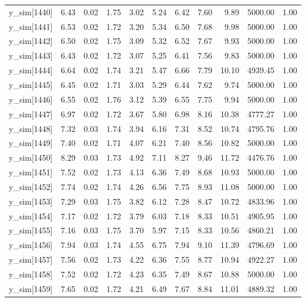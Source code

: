 \begin{table}[ht]
\begin{tabular}{rrrrrrrrrrr}
  y\_sim[1440] & 6.43 & 0.02 & 1.75 & 3.02 & 5.24 & 6.42 & 7.60 & 9.89 & 5000.00 & 1.00 \\ 
  y\_sim[1441] & 6.53 & 0.02 & 1.72 & 3.20 & 5.34 & 6.50 & 7.68 & 9.98 & 5000.00 & 1.00 \\ 
  y\_sim[1442] & 6.50 & 0.02 & 1.75 & 3.09 & 5.32 & 6.52 & 7.67 & 9.93 & 5000.00 & 1.00 \\ 
  y\_sim[1443] & 6.43 & 0.02 & 1.72 & 3.07 & 5.25 & 6.41 & 7.56 & 9.83 & 5000.00 & 1.00 \\ 
  y\_sim[1444] & 6.64 & 0.02 & 1.74 & 3.21 & 5.47 & 6.66 & 7.79 & 10.10 & 4939.45 & 1.00 \\ 
  y\_sim[1445] & 6.45 & 0.02 & 1.71 & 3.03 & 5.29 & 6.44 & 7.62 & 9.74 & 5000.00 & 1.00 \\ 
  y\_sim[1446] & 6.55 & 0.02 & 1.76 & 3.12 & 5.39 & 6.55 & 7.75 & 9.94 & 5000.00 & 1.00 \\ 
  y\_sim[1447] & 6.97 & 0.02 & 1.72 & 3.67 & 5.80 & 6.98 & 8.16 & 10.38 & 4777.27 & 1.00 \\ 
  y\_sim[1448] & 7.32 & 0.03 & 1.74 & 3.94 & 6.16 & 7.31 & 8.52 & 10.74 & 4795.76 & 1.00 \\ 
  y\_sim[1449] & 7.40 & 0.02 & 1.71 & 4.07 & 6.21 & 7.40 & 8.56 & 10.82 & 5000.00 & 1.00 \\ 
  y\_sim[1450] & 8.29 & 0.03 & 1.73 & 4.92 & 7.11 & 8.27 & 9.46 & 11.72 & 4476.76 & 1.00 \\ 
  y\_sim[1451] & 7.52 & 0.02 & 1.73 & 4.13 & 6.36 & 7.49 & 8.68 & 10.93 & 5000.00 & 1.00 \\ 
  y\_sim[1452] & 7.74 & 0.02 & 1.74 & 4.26 & 6.56 & 7.75 & 8.93 & 11.08 & 5000.00 & 1.00 \\ 
  y\_sim[1453] & 7.29 & 0.03 & 1.75 & 3.82 & 6.12 & 7.28 & 8.47 & 10.72 & 4833.96 & 1.00 \\ 
  y\_sim[1454] & 7.17 & 0.02 & 1.72 & 3.79 & 6.03 & 7.18 & 8.33 & 10.51 & 4905.95 & 1.00 \\ 
  y\_sim[1455] & 7.16 & 0.03 & 1.75 & 3.70 & 5.97 & 7.15 & 8.33 & 10.56 & 4860.21 & 1.00 \\ 
  y\_sim[1456] & 7.94 & 0.03 & 1.74 & 4.55 & 6.75 & 7.94 & 9.10 & 11.39 & 4796.69 & 1.00 \\ 
  y\_sim[1457] & 7.56 & 0.02 & 1.73 & 4.22 & 6.36 & 7.55 & 8.77 & 10.94 & 4922.27 & 1.00 \\ 
  y\_sim[1458] & 7.52 & 0.02 & 1.72 & 4.23 & 6.35 & 7.49 & 8.67 & 10.88 & 5000.00 & 1.00 \\ 
  y\_sim[1459] & 7.65 & 0.02 & 1.72 & 4.21 & 6.49 & 7.67 & 8.84 & 11.01 & 4889.32 & 1.00 \\ 

\end{tabular}
\end{table}
